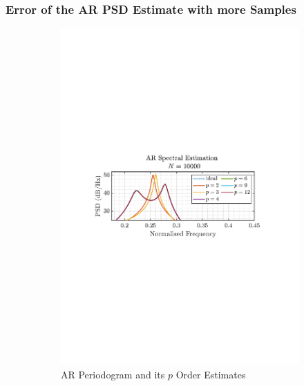 \documentclass[12pt]{article}
\begin{document}
	\subsubsection{Error of the AR PSD Estimate with more Samples}
	\begin{figure}[H]
		\centering
		\begin{subfigure}{0.49\textwidth}
			\centering
			\includegraphics[trim={2.2cm 11.2cm 3.15cm  11.2cm}, clip, width=\textwidth]{../MATLAB/figures/q1_4c_fig14.pdf} 
			\captionsetup{justification=centering}
			\caption{AR Periodogram and its $p$ Order Estimates}
		\end{subfigure}
		\begin{subfigure}{0.49\textwidth}
			\centering

\end{subfigure}
\end{figure}
\end{document}
